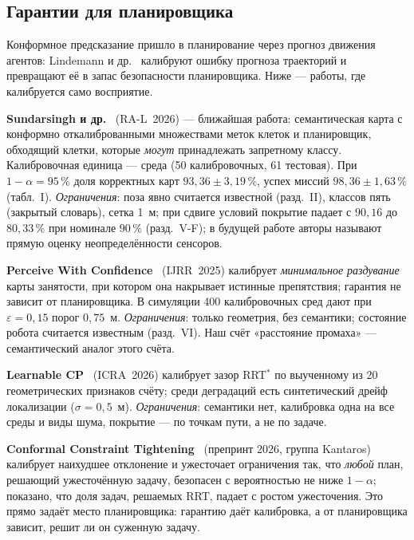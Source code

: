 \subsection*{Гарантии для планировщика}

Конформное предсказание пришло в планирование через прогноз движения агентов: Lindemann и др.~\cite{lindemann} калибруют ошибку прогноза траекторий и превращают её в запас безопасности планировщика. Ниже --- работы, где калибруется само восприятие.


\textbf{Sundarsingh и др.}~\cite{sundarsingh} (RA-L~2026) --- ближайшая работа: семантическая карта с конформно откалиброванными множествами меток клеток и планировщик, обходящий клетки, которые \emph{могут} принадлежать запретному классу. Калибровочная единица --- среда (50 калибровочных, 61 тестовая). При $1-\alpha = 95\,\%$ доля корректных карт $93{,}36 \pm 3{,}19\,\%$, успех миссий $98{,}36 \pm 1{,}63\,\%$ (табл.~I). \emph{Ограничения}: поза явно считается известной (разд.~II), классов пять (закрытый словарь), сетка 1~м; при сдвиге условий покрытие падает с $90{,}16$ до $80{,}33\,\%$ при номинале $90\,\%$ (разд.~V-F); в будущей работе авторы называют прямую оценку неопределённости сенсоров.

\textbf{Perceive With Confidence}~\cite{pwc} (IJRR~2025) калибрует \emph{минимальное раздувание} карты занятости, при котором она накрывает истинные препятствия; гарантия не зависит от планировщика. В симуляции 400 калибровочных сред дают при $\varepsilon = 0{,}15$ порог $0{,}75$~м. \emph{Ограничения}: только геометрия, без семантики; состояние робота считается известным (разд.~VI). Наш счёт «расстояние промаха» --- семантический аналог этого счёта.

\textbf{Learnable CP}~\cite{learnablecp} (ICRA~2026) калибрует зазор RRT$^*$ по выученному из 20 геометрических признаков счёту; среди деградаций есть синтетический дрейф локализации ($\sigma = 0{,}5$~м). \emph{Ограничения}: семантики нет, калибровка одна на все среды и виды шума, покрытие --- по точкам пути, а не по задаче.

\textbf{Conformal Constraint Tightening}~\cite{tightening} (препринт 2026, группа Kantaros) калибрует наихудшее отклонение и ужесточает ограничения так, что \emph{любой} план, решающий ужесточённую задачу, безопасен с вероятностью не ниже $1-\alpha$; показано, что доля задач, решаемых RRT, падает с ростом ужесточения. Это прямо задаёт место планировщика: гарантию даёт калибровка, а от планировщика зависит, решит ли он суженную задачу.

